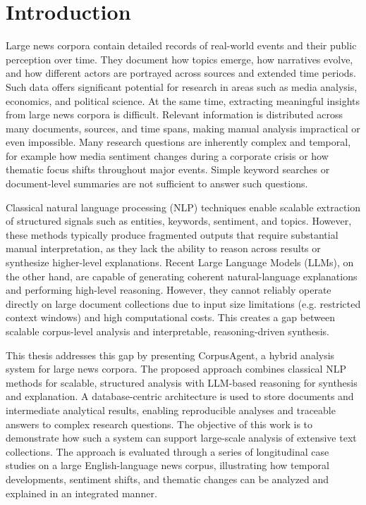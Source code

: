 

\chapter{Introduction} %

\label{Chapter1}

Large news corpora contain detailed records of real-world events and their public perception over time. They document how topics emerge, how narratives evolve, and how different actors are portrayed across sources and extended time periods.
Such data offers significant potential for research in areas such as media analysis, economics, and political science. At the same time, extracting meaningful insights from large news corpora is difficult. Relevant information is distributed across many documents, sources, and time spans, making manual analysis impractical or even impossible. Many research questions are inherently complex and temporal, for example how media sentiment changes during a corporate crisis or how thematic focus shifts throughout major events. Simple keyword searches or document-level summaries are not sufficient to answer such questions.

Classical natural language processing (NLP) techniques enable scalable extraction of structured signals such as entities, keywords, sentiment, and topics. However, these methods typically produce fragmented outputs that require substantial manual interpretation, as they lack the ability to reason across results or synthesize higher-level explanations.
Recent Large Language Models (LLMs), on the other hand, are capable of generating coherent natural-language explanations and performing high-level reasoning. However, they cannot reliably operate directly on large document collections due to input size limitations (e.g. restricted context windows) and high computational costs. This creates a gap between scalable corpus-level analysis and interpretable, reasoning-driven synthesis.

This thesis addresses this gap by presenting CorpusAgent, a hybrid analysis system for large news corpora. The proposed approach combines classical NLP methods for scalable, structured analysis with LLM-based reasoning for synthesis and explanation. A database-centric architecture is used to store documents and intermediate analytical results, enabling reproducible analyses and traceable answers to complex research questions.
The objective of this work is to demonstrate how such a system can support large-scale analysis of extensive text collections. The approach is evaluated through a series of longitudinal case studies on a large English-language news corpus, illustrating how temporal developments, sentiment shifts, and thematic changes can be analyzed and explained in an integrated manner.


